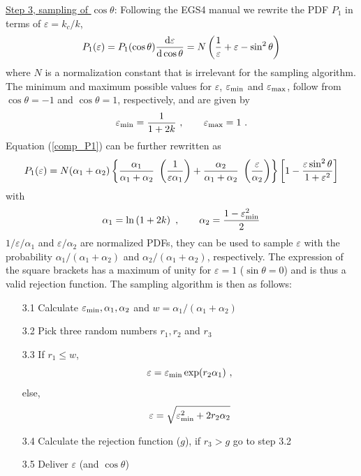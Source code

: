 \underline{Step 3, sampling of $\cos \theta$}: Following 
the EGS4 manual\cite{Ne85} we rewrite 
the PDF $P_1$ in terms of $\varepsilon = k_c/k$,
\begin{equation}
\label{comp_P1}
P_1(\varepsilon) = P_1(\cos \theta) {{\rm d}\varepsilon \over 
{\rm d} \cos \theta} = N \left( \frac{1}{\varepsilon} + \varepsilon - 
\sin^2 \theta \right)
\end{equation}
where $N$ is a normalization constant that is irrelevant for the sampling 
algorithm. The minimum and maximum possible values for 
$\varepsilon$, $\varepsilon_{\rm min}$ and $\varepsilon_{\rm max}$, follow 
from $\cos \theta = -1$ and $\cos \theta = 1$, respectively, and are 
given by
\begin{equation}
\varepsilon_{{\rm min}} = {1 \over 1 + 2 k}~, \quad \quad 
\varepsilon_{{\rm max}} = 1~.
\end{equation}
Equation (\ref{comp_P1}) can be further rewritten as 
\begin{equation}
P_1(\varepsilon) = N (\alpha_1 + \alpha_2) \left\{
{\alpha_1 \over \alpha_1 + \alpha_2}~
\left({1 \over \varepsilon \alpha_1} \right)
+ {\alpha_2 \over \alpha_1 + \alpha_2}~\left({ \varepsilon \over \alpha_2}
\right) \right\} \left[ 1 - {\varepsilon \sin^2 \theta \over 1 + 
\varepsilon^2 } \right]
\end{equation}  
with 
\begin{equation}
\alpha_1  =  \ln \left(1 + 2 k \right)~, \quad \quad 
\alpha_2  = {1 - \varepsilon_{\rm min}^2 \over 2}
\end{equation}
$1/\varepsilon/\alpha_1$ and $\varepsilon/\alpha_2$ are 
normalized PDFs, they can be used to sample $\varepsilon$ 
with the probability $\alpha_1/(\alpha_1 + \alpha_2)$ and 
$\alpha_2/(\alpha_1 + \alpha_2)$, respectively. The expression 
of the square brackets has a maximum of unity for 
$\varepsilon = 1$ ($\sin \theta = 0$) and is thus 
a valid rejection function. The sampling algorithm is then as follows:
\begin{itemize}  
\item[3.1]
Calculate $\varepsilon_{\rm min}, \alpha_1, \alpha_2$ and 
$w = \alpha_1/(\alpha_1 + \alpha_2)$
\item[3.2]
Pick three random numbers $r_1, r_2$ and $r_3$ 
\item[3.3]
If $r_1 \le w$, 
\begin{equation}
\varepsilon = \varepsilon_{\rm min} \exp( r_2 \alpha_1 )~,
\end{equation}
else,
\begin{equation}
\varepsilon = \sqrt{ \varepsilon_{\rm min}^2 + 2 r_2 \alpha_2}
\end{equation}
\item[3.4]
Calculate the rejection function ($g$), if $r_3 > g$ go to step 3.2 
\item[3.5]
Deliver $\varepsilon$ (and $\cos \theta$)
\end{itemize}  
